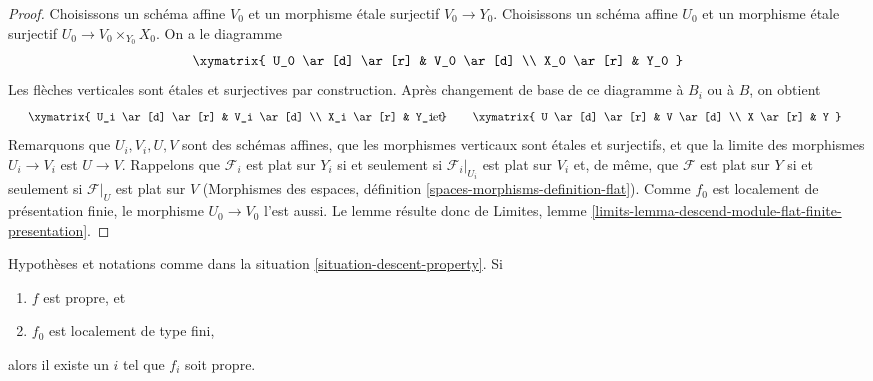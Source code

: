 \begin{proof}
Choisissons un schéma affine $V_0$ et un morphisme étale surjectif
$V_0 \to Y_0$. Choisissons un schéma affine $U_0$ et un morphisme étale
surjectif $U_0 \to V_0 \times_{Y_0} X_0$. On a le diagramme
$$
\xymatrix{
U_0 \ar[d] \ar[r] & V_0 \ar[d] \\
X_0 \ar[r] & Y_0
}
$$
Les flèches verticales sont étales et surjectives par construction.
Après changement de base de ce diagramme à $B_i$ ou à $B$, on obtient
$$
\vcenter{
\xymatrix{
U_i \ar[d] \ar[r] & V_i \ar[d] \\
X_i \ar[r] & Y_i
}
}
\quad\text{et}\quad
\vcenter{
\xymatrix{
U \ar[d] \ar[r] & V \ar[d] \\
X \ar[r] & Y
}
}
$$
Remarquons que $U_i, V_i, U, V$ sont des schémas affines, que les morphismes verticaux sont
étales et surjectifs, et que la limite des morphismes $U_i \to V_i$ est
$U \to V$. Rappelons que $\mathcal{F}_i$ est plat sur $Y_i$ si et seulement si
$\mathcal{F}_i|_{U_i}$ est plat sur $V_i$ et, de même, que $\mathcal{F}$ est plat
sur $Y$ si et seulement si $\mathcal{F}|_U$ est plat sur $V$
(Morphismes des espaces, définition \ref{spaces-morphisms-definition-flat}).
Comme $f_0$ est localement de présentation finie, le morphisme
$U_0 \to V_0$ l'est aussi. Le lemme résulte donc
de Limites, lemme \ref{limits-lemma-descend-module-flat-finite-presentation}.
\end{proof}

\begin{lemma}
\label{lemma-eventually-proper}
Hypothèses et notations comme dans la situation \ref{situation-descent-property}.
Si
\begin{enumerate}
\item $f$ est propre, et
\item $f_0$ est localement de type fini,
\end{enumerate}
alors il existe un $i$ tel que $f_i$ soit propre.
\end{lemma}

